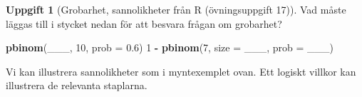 \documentclass[
]{book}
\newenvironment{Shaded}{\begin{snugshade}}{\end{snugshade}}
\newcommand{\AttributeTok}[1]{\textcolor[rgb]{0.13,0.29,0.53}{#1}}
\newcommand{\DecValTok}[1]{\textcolor[rgb]{0.00,0.00,0.81}{#1}}
\newcommand{\FloatTok}[1]{\textcolor[rgb]{0.00,0.00,0.81}{#1}}
\newcommand{\FunctionTok}[1]{\textcolor[rgb]{0.13,0.29,0.53}{\textbf{#1}}}
\newcommand{\NormalTok}[1]{#1}
\newcommand{\SpecialCharTok}[1]{\textcolor[rgb]{0.81,0.36,0.00}{\textbf{#1}}}
\theoremstyle{definition}
\theoremstyle{definition}
\theoremstyle{definition}
\newtheorem{exercise}{Uppgift}[chapter]
\theoremstyle{definition}
\theoremstyle{remark}
\begin{document}
\begin{exercise}[Grobarhet, sannolikheter från R (övningsuppgift 17)]

Vad måste läggas till i stycket nedan för att besvara frågan om grobarhet?

\begin{Shaded}
\begin{Highlighting}[]
\FunctionTok{pbinom}\NormalTok{(\_\_\_, }\DecValTok{10}\NormalTok{, }\AttributeTok{prob =} \FloatTok{0.6}\NormalTok{)}
\DecValTok{1} \SpecialCharTok{{-}} \FunctionTok{pbinom}\NormalTok{(}\DecValTok{7}\NormalTok{, }\AttributeTok{size =}\NormalTok{ \_\_\_, }\AttributeTok{prob =}\NormalTok{ \_\_\_)}
\end{Highlighting}
\end{Shaded}

\end{exercise}

Vi kan illustrera sannolikheter som i myntexemplet ovan. Ett logiskt villkor kan illustrera de relevanta staplarna.
\end{document}
